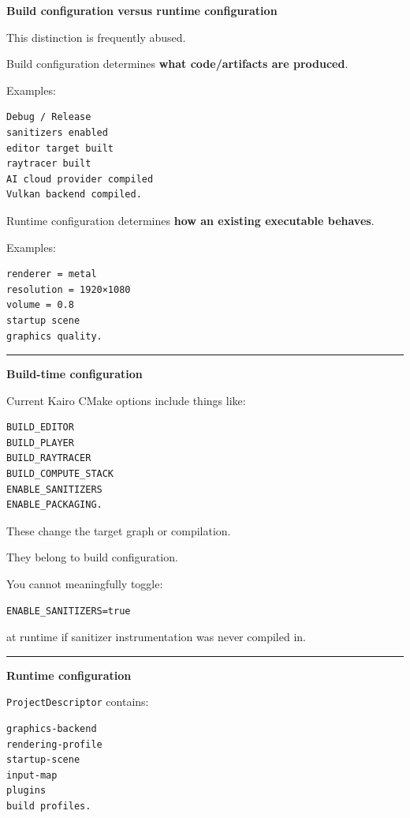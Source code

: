 \textbf{Build configuration versus runtime configuration}

This distinction is frequently abused.

Build configuration determines \textbf{what code/artifacts are produced}.

Examples:

\begin{verbatim}
Debug / Release
sanitizers enabled
editor target built
raytracer built
AI cloud provider compiled
Vulkan backend compiled.
\end{verbatim}

Runtime configuration determines \textbf{how an existing executable behaves}.

Examples:

\begin{verbatim}
renderer = metal
resolution = 1920×1080
volume = 0.8
startup scene
graphics quality.
\end{verbatim}

\begin{center}\rule{0.5\linewidth}{0.5pt}\end{center}

\textbf{Build-time configuration}

Current Kairo CMake options include things like:

\begin{verbatim}
BUILD_EDITOR
BUILD_PLAYER
BUILD_RAYTRACER
BUILD_COMPUTE_STACK
ENABLE_SANITIZERS
ENABLE_PACKAGING.
\end{verbatim}

These change the target graph or compilation.

They belong to build configuration.

You cannot meaningfully toggle:

\begin{verbatim}
ENABLE_SANITIZERS=true
\end{verbatim}

at runtime if sanitizer instrumentation was never compiled in.

\begin{center}\rule{0.5\linewidth}{0.5pt}\end{center}

\textbf{Runtime configuration}

\texttt{ProjectDescriptor} contains:

\begin{verbatim}
graphics-backend
rendering-profile
startup-scene
input-map
plugins
build profiles.
\end{verbatim}

